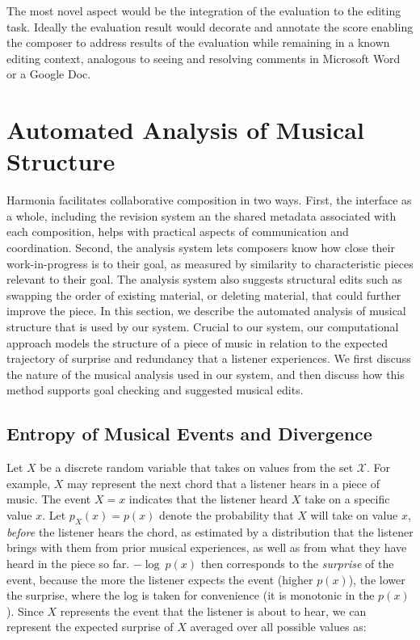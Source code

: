 \documentclass[final,authoryear,5p,times,twocolumn]{elsarticle}
\begin{document}
The most novel aspect would be the integration of the evaluation to the editing task. Ideally the evaluation result would decorate and annotate the score enabling the composer to address results of the evaluation while remaining in a known editing context, analogous to seeing and resolving comments in Microsoft Word or a Google Doc.

\section{Automated Analysis of Musical Structure}

Harmonia facilitates collaborative composition in two ways. First, the interface as a whole, including the revision system an the shared metadata associated with each composition, helps with practical aspects of communication and coordination. Second, the analysis system lets composers know how close their work-in-progress is to their goal, as measured by similarity to characteristic pieces relevant to their goal. The analysis system also suggests structural edits such as swapping the order of existing material, or deleting material, that could further improve the piece. In this section, we describe the automated analysis of musical structure that is used by our system. Crucial to our system, our computational approach models the structure of a piece of music in relation to the expected trajectory of surprise and redundancy that a listener experiences. We first discuss the nature of the musical analysis used in our system, and then discuss how this method supports goal checking and suggested musical edits.

\subsection{Entropy of Musical Events and Divergence}
 
Let $X$ be a discrete random variable that takes on values from the set $\mathcal{X}$. For example, $X$ may represent the next chord that a listener hears in a piece of music. The event $X=x$ indicates that the listener heard $X$ take on a specific value $x$. Let $p_X(x) = p(x)$ denote the probability that $X$ will take on value $x$, \textit{before} the listener hears the chord, as estimated by a distribution that the listener brings with them from prior musical experiences, as well as from what they have heard in the piece so far. $-\log\ p(x)$ then corresponds to the \textit{surprise} of the event, because the more the listener expects the event (higher $p(x)$), the lower the surprise, where the log is taken for convenience (it is monotonic in the $p(x)$). Since $X$ represents the event that the listener is about to hear, we can represent the expected surprise of $X$ averaged over all possible values as:
 
\end{document}
